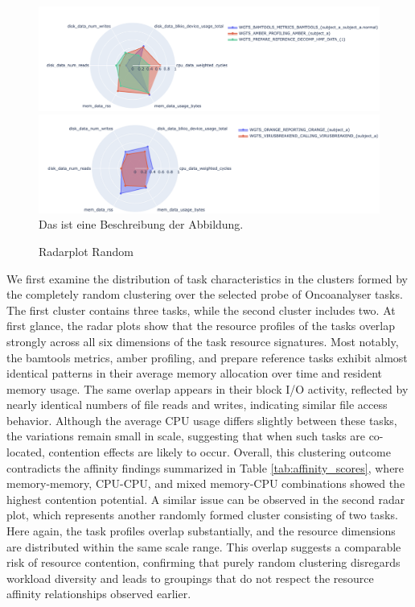 \begin{figure}[H]
    \caption{Radarplot Random}
    \includegraphics[scale=0.45]{fig/06/06-radarplot-random.png}
    \includegraphics[scale=0.45]{fig/06/06-radarplot-random-2.png}
    \label{fig:radarplot_random}
    \newline
    \tiny
    Das ist eine Beschreibung der Abbildung.
\end{figure}

We first examine the distribution of task characteristics in the clusters formed by the completely random clustering over the selected probe of Oncoanalyser tasks. The first cluster contains three tasks, while the second cluster includes two. At first glance, the radar plots show that the resource profiles of the tasks overlap strongly across all six dimensions of the task resource signatures. Most notably, the bamtools metrics, amber profiling, and prepare reference tasks exhibit almost identical patterns in their average memory allocation over time and resident memory usage. The same overlap appears in their block I/O activity, reflected by nearly identical numbers of file reads and writes, indicating similar file access behavior.
Although the average CPU usage differs slightly between these tasks, the variations remain small in scale, suggesting that when such tasks are co-located, contention effects are likely to occur. Overall, this clustering outcome contradicts the affinity findings summarized in Table \ref{tab:affinity_scores}, where memory-memory, CPU-CPU, and mixed memory-CPU combinations showed the highest contention potential.
A similar issue can be observed in the second radar plot, which represents another randomly formed cluster consisting of two tasks. Here again, the task profiles overlap substantially, and the resource dimensions are distributed within the same scale range. This overlap suggests a comparable risk of resource contention, confirming that purely random clustering disregards workload diversity and leads to groupings that do not respect the resource affinity relationships observed earlier.

